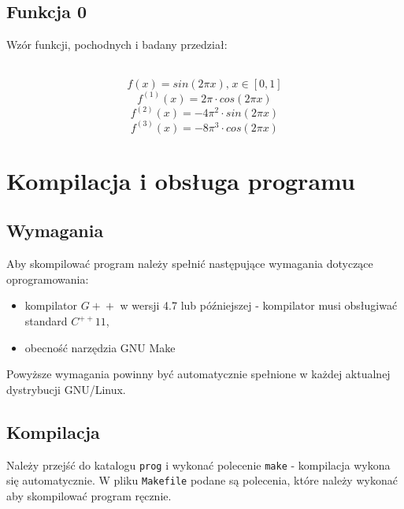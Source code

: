 \documentclass[a4paper,11pt]{article}
\begin{document}
    \subsection{Funkcja 0}
      Wzór funkcji, pochodnych i badany przedział: \\ 
       \\
      $$ f(x) = sin(2 \pi x)  \textrm{,} \; x \in [0,1] $$
      $$ f^{(1)}(x) = 2 \pi \cdot cos(2 \pi x) $$
      $$ f^{(2)}(x) = -4 \pi^2 \cdot sin(2 \pi x) $$
      $$ f^{(3)}(x) = -8 \pi^3 \cdot cos(2 \pi x) $$
      
  \section{Kompilacja i obsługa programu}
    \subsection{Wymagania}
    Aby skompilować program należy spełnić następujące wymagania dotyczące oprogramowania:
    \begin{itemize}
      \item kompilator $ G\!+\!+ $ w wersji 4.7 lub późniejszej - kompilator musi obsługiwać standard $ C^{++}11 $,
      \item obecność narzędzia GNU Make
    \end{itemize}
    Powyższe wymagania powinny być automatycznie spełnione w każdej aktualnej dystrybucji GNU/Linux.
    
    \subsection{Kompilacja}
    Należy przejść do katalogu \texttt{prog} i wykonać polecenie \texttt{make} - kompilacja wykona się automatycznie. W pliku \texttt{Makefile} podane są polecenia, które należy wykonać aby skompilować program ręcznie.
    
\end{document}
